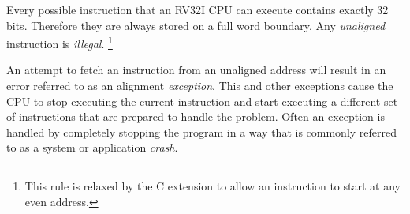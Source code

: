 Every possible instruction that an RV32I CPU can execute contains
exactly 32 bits.  Therefore they are always stored on a full word
boundary.  Any {\em unaligned} instruction is {\em illegal}.%
\footnote{This rule is relaxed by the C extension to allow an 
instruction to start at any even address.\cite[p.~5]{rvismv1v22:2017}}

An attempt to fetch an instruction from an unaligned address
will result in an error referred to as an alignment {\em \gls{exception}}.
This and other exceptions cause the CPU to stop executing the
current instruction and start executing a different set of instructions
that are prepared to handle the problem.  Often an exception is
handled by completely stopping the program in a way that is commonly
referred to as a system or application {\em crash}.
